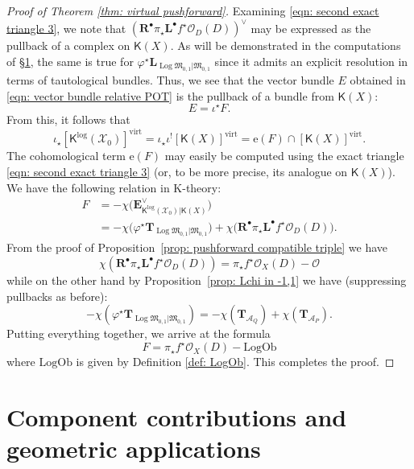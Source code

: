 \documentclass[11pt]{amsart}
\theoremstyle{definition}
\theoremstyle{definition}
\newcommand{\EE}{\mathbf{E}}
\newcommand{\LL}{\mathbf{L}}
\newcommand{\op}[1]{\operatorname{#1}}
\newcommand{\TT}{\mathbf{T}}
\newcommand{\e}{\mathrm{e}}
\newcommand{\OO}{\mathcal{O}}
\newcommand{\virt}{\op{virt}}
\newcommand{\LogOb}{\mathrm{LogOb}}
\newcommand{\Acal}{\mathcal{A}}
\newcommand{\Xcal}{\mathcal{X}}
\newcommand{\Mfrak}{\mathfrak{M}}
\newcommand{\Rder}{\mathbf{R}^\bullet}
\newcommand{\Lder}{\mathbf{L}^\bullet}
\newcommand{\Kup}{\mathsf{K}}
\newcommand{\Log}{\operatorname{Log}}
\begin{document}
\begin{proof}[Proof of Theorem \ref{thm: virtual pushforward}] Examining \eqref{eqn: second exact triangle 3}, we note that $(\Rder \pi_\star \Lder f^\star \OO_D(D))^\vee$ may be expressed as the pullback of a complex on $\Kup(X)$. As will be demonstrated in the computations of \S \ref{sec: component calculations}, the same is true for $\varphi^\star \LL_{\Log\Mfrak_{0,1}|\Mfrak_{0,1}}$ since it admits an explicit resolution in terms of tautological bundles. Thus, we see that the vector bundle $E$ obtained in \eqref{eqn: vector bundle relative POT} is the pullback of a bundle from $\Kup(X)$:
\begin{equation*} E = \iota^\star F.\end{equation*}
From this, it follows that
\begin{equation*} \iota_\star [\Kup^{\log}(\Xcal_0)]^{\virt} = \iota_\star \iota^! [\Kup(X)]^{\virt} = \e(F) \cap [\Kup(X)]^{\virt}. \end{equation*}
The cohomological term $\e(F)$ may easily be computed using the exact triangle \eqref{eqn: second exact triangle 3} (or, to be more precise, its analogue on $\Kup(X)$). We have the following relation in K-theory:
\begin{align*} F & = -\chi \big(\EE_{\Kup^{\log}(\Xcal_0)|\Kup(X)}^\vee \big) \\
& = -\chi \big(\varphi^\star \TT_{\Log\Mfrak_{0,1}|\Mfrak_{0,1}}\big) + \chi \big( \Rder \pi_\star \Lder f^\star \OO_D(D) \big).
\end{align*}
From the proof of Proposition~\ref{prop: pushforward compatible triple} we have
\begin{equation*}\chi ( \Rder \pi_\star \Lder f^\star \OO_D(D) ) = \pi_\star f^\star \OO_X(D) - \OO\end{equation*}
while on the other hand by Proposition~\ref{prop: Lchi in -1,1} we have (suppressing pullbacks as before):
\begin{equation*} -\chi(\varphi^\star \TT_{\Log\Mfrak_{0,1}|\Mfrak_{0,1}}) = -\chi(\TT_{\Acal_Q}) + \chi(\TT_{\Acal_P}). \end{equation*}
Putting everything together, we arrive at the formula
\begin{equation*} F = \pi_\star f^\star \OO_X(D) - \LogOb \end{equation*}
where $\LogOb$ is given by Definition \ref{def: LogOb}. This completes the proof.\end{proof}

\section{Component contributions and geometric applications}\label{sec: component calculations}
\end{document}
